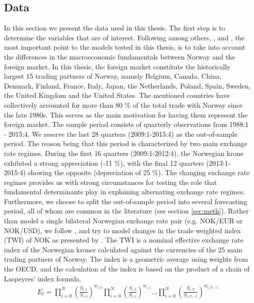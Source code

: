 \documentclass[10pt]{article}
\numberwithin{equation}{section}
\numberwithin{table}{section}
\numberwithin{figure}{section}
\begin{document}
\begin{spacing}{1.5}
\section{Data}
\label{sec:data}

\noindent In this section we present the data used in this thesis. The first step is to determine the variables that are of interest. Following among others, \cite{reinton1999out}, \cite{chin2007monetary,chin2007monetaryb} and \cite{papadamou2012monetary}, the most important point to the models tested in this thesis, is to take into account the differences in the macroeconomic fundamentals between Norway and the foreign market. In this thesis, the foreign market constitute the historically largest 15 trading partners of Norway, namely Belgium, Canada, China, Denmark, Finland, France, Italy, Japan, the Netherlands, Poland, Spain, Sweden, the United Kingdom and the United States. The mentioned countries have collectively accounted for more than 80 \% of the total trade with Norway since the late 1980s. This serves as the main motivation for having them represent the foreign market. The sample period consists of quarterly observations from 1988:1 - 2015:4. We reserve the last 28 quarters (2009:1-2015:4) as the out-of-sample period. The reason being that this period is characterized by two main exchange rate regimes. During the first 16 quarters (2009:1-2012:4), the Norwegian krone exhibited a strong appreciation (-11 \%), with the final 12 quarters (2013:1-2015:4) showing the opposite (depreciation of 25 \%). The changing exchange rate regimes provides us with strong circumstances for testing the role that fundamental determinants play in explaining alternating exchange rate regimes. Furthermore, we choose to split the out-of-sample period into several forecasting period, all of whom are common in the literature (see section \ref{sec:meth}). Rather than model a single bilateral Norwegian exchange rate pair (e.g. NOK/EUR or NOK/USD), we follow \cite{akram2000does,akram2004oil}, and try to model changes in the trade weighted index (TWI) of NOK as presented by \cite{NBa}. The TWI is a nominal effective exchange rate index of the Norwegian kroner calculated against the currencies of the 25 main trading partners of Norway. The index is a geometric average using weights from the OECD, and the calculation of the index is based on the product of a chain of Laspeyres’ index formula. 
\begin{align}
    E_t = \prod_{i=0}^N\left(\frac{S_{i,1}}{S_{i,0}} \right)^{w_{i,0}}\prod_{i=0}^N\left(\frac{S_{i,2}}{S_{i,1}} \right)^{w_{i,1}}\hdots \prod_{i=0}^N\left(\frac{S_{i,T}}{S_{i,T-1}} \right)^{w_{i,T-1}}  

\end{align}
\end{spacing}
\end{document}
